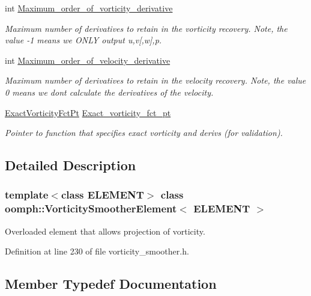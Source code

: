 \begin{DoxyCompactItemize}
int \hyperlink{classoomph_1_1VorticitySmootherElement_ab5cbc36edc0935a8a8bed8fe570bd403}{Maximum\+\_\+order\+\_\+of\+\_\+vorticity\+\_\+derivative}
\begin{DoxyCompactList}\small\item\em Maximum number of derivatives to retain in the vorticity recovery. Note, the value -\/1 means we O\+N\+LY output u,v\mbox{[},w\mbox{]},p. \end{DoxyCompactList}\item 
int \hyperlink{classoomph_1_1VorticitySmootherElement_a9fb49eba4ca7b0ffd94c4a728c5f9a17}{Maximum\+\_\+order\+\_\+of\+\_\+velocity\+\_\+derivative}
\begin{DoxyCompactList}\small\item\em Maximum number of derivatives to retain in the velocity recovery. Note, the value 0 means we don\textquotesingle{}t calculate the derivatives of the velocity. \end{DoxyCompactList}\item 
\hyperlink{classoomph_1_1VorticitySmootherElement_ad4ed9d81ba7718bf747e0abdd41cdaa1}{Exact\+Vorticity\+Fct\+Pt} \hyperlink{classoomph_1_1VorticitySmootherElement_a63f838b49c19f7c3686c50b455da2e36}{Exact\+\_\+vorticity\+\_\+fct\+\_\+pt}
\begin{DoxyCompactList}\small\item\em Pointer to function that specifies exact vorticity and derivs (for validation). \end{DoxyCompactList}\end{DoxyCompactItemize}


\subsection{Detailed Description}
\subsubsection*{template$<$class E\+L\+E\+M\+E\+NT$>$\newline
class oomph\+::\+Vorticity\+Smoother\+Element$<$ E\+L\+E\+M\+E\+N\+T $>$}

Overloaded element that allows projection of vorticity. 

Definition at line 230 of file vorticity\+\_\+smoother.\+h.



\subsection{Member Typedef Documentation}
\mbox{\label{classoomph_1_1VorticitySmootherElement_ad4ed9d81ba7718bf747e0abdd41cdaa1}} 
